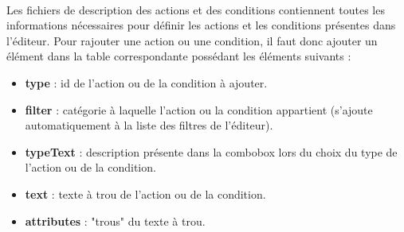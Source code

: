 \documentclass[a4paper]{article}
\begin{document}
\paragraph{ } Les fichiers de description des actions et des conditions contiennent toutes les informations nécessaires pour définir les actions et les conditions présentes dans l'éditeur. Pour rajouter une action ou une condition, il faut donc ajouter un élément dans la table correspondante possédant les éléments suivants :
\begin{itemize}
\item \textbf{type} : id de l'action ou de la condition à ajouter.
\item \textbf{filter} : catégorie à laquelle l'action ou la condition appartient (s'ajoute automatiquement à la liste des filtres de l'éditeur).
\item \textbf{typeText} : description présente dans la combobox lors du choix du type de l'action ou de la condition.
\item \textbf{text} : texte à trou de l'action ou de la condition.
\item \textbf{attributes} : "trous" du texte à trou.
\end{itemize}
\end{document}
